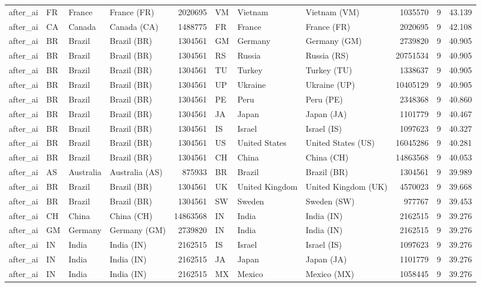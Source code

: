 \begin{tabular}{llllrlllrrr}
after\_ai & FR & France & France (FR) & 2020695 & VM & Vietnam & Vietnam (VM) & 1035570 & 9 & 43.139 \\
after\_ai & CA & Canada & Canada (CA) & 1488775 & FR & France & France (FR) & 2020695 & 9 & 42.108 \\
after\_ai & BR & Brazil & Brazil (BR) & 1304561 & GM & Germany & Germany (GM) & 2739820 & 9 & 40.905 \\
after\_ai & BR & Brazil & Brazil (BR) & 1304561 & RS & Russia & Russia (RS) & 20751534 & 9 & 40.905 \\
after\_ai & BR & Brazil & Brazil (BR) & 1304561 & TU & Turkey & Turkey (TU) & 1338637 & 9 & 40.905 \\
after\_ai & BR & Brazil & Brazil (BR) & 1304561 & UP & Ukraine & Ukraine (UP) & 10405129 & 9 & 40.905 \\
after\_ai & BR & Brazil & Brazil (BR) & 1304561 & PE & Peru & Peru (PE) & 2348368 & 9 & 40.860 \\
after\_ai & BR & Brazil & Brazil (BR) & 1304561 & JA & Japan & Japan (JA) & 1101779 & 9 & 40.467 \\
after\_ai & BR & Brazil & Brazil (BR) & 1304561 & IS & Israel & Israel (IS) & 1097623 & 9 & 40.327 \\
after\_ai & BR & Brazil & Brazil (BR) & 1304561 & US & United States & United States (US) & 16045286 & 9 & 40.281 \\
after\_ai & BR & Brazil & Brazil (BR) & 1304561 & CH & China & China (CH) & 14863568 & 9 & 40.053 \\
after\_ai & AS & Australia & Australia (AS) & 875933 & BR & Brazil & Brazil (BR) & 1304561 & 9 & 39.989 \\
after\_ai & BR & Brazil & Brazil (BR) & 1304561 & UK & United Kingdom & United Kingdom (UK) & 4570023 & 9 & 39.668 \\
after\_ai & BR & Brazil & Brazil (BR) & 1304561 & SW & Sweden & Sweden (SW) & 977767 & 9 & 39.453 \\
after\_ai & CH & China & China (CH) & 14863568 & IN & India & India (IN) & 2162515 & 9 & 39.276 \\
after\_ai & GM & Germany & Germany (GM) & 2739820 & IN & India & India (IN) & 2162515 & 9 & 39.276 \\
after\_ai & IN & India & India (IN) & 2162515 & IS & Israel & Israel (IS) & 1097623 & 9 & 39.276 \\
after\_ai & IN & India & India (IN) & 2162515 & JA & Japan & Japan (JA) & 1101779 & 9 & 39.276 \\
after\_ai & IN & India & India (IN) & 2162515 & MX & Mexico & Mexico (MX) & 1058445 & 9 & 39.276 \\

\end{tabular}
